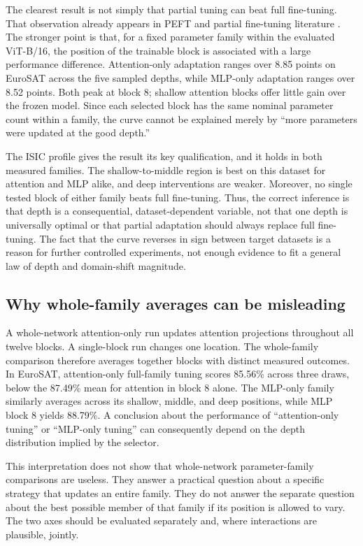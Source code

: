 \documentclass[11pt]{article}
\begin{document}
The clearest result is not simply that partial tuning can beat full fine-tuning. That observation already appears in PEFT and partial fine-tuning literature \cite{basu2024,lian2022,ye2023}. The stronger point is that, for a fixed parameter family within the evaluated ViT-B/16, the position of the trainable block is associated with a large performance difference. Attention-only adaptation ranges over 8.85 points on EuroSAT across the five sampled depths, while MLP-only adaptation ranges over 8.52 points. Both peak at block 8; shallow attention blocks offer little gain over the frozen model. Since each selected block has the same nominal parameter count within a family, the curve cannot be explained merely by “more parameters were updated at the good depth.”

The ISIC profile gives the result its key qualification, and it holds in both measured families. The shallow-to-middle region is best on this dataset for attention and MLP alike, and deep interventions are weaker. Moreover, no single tested block of either family beats full fine-tuning. Thus, the correct inference is that depth is a consequential, dataset-dependent variable, not that one depth is universally optimal or that partial adaptation should always replace full fine-tuning. The fact that the curve reverses in sign between target datasets is a reason for further controlled experiments, not enough evidence to fit a general law of depth and domain-shift magnitude.

\subsection{Why whole-family averages can be misleading}

A whole-network attention-only run updates attention projections throughout all twelve blocks. A single-block run changes one location. The whole-family comparison therefore averages together blocks with distinct measured outcomes. In EuroSAT, attention-only full-family tuning scores 85.56\% across three draws, below the 87.49\% mean for attention in block 8 alone. The MLP-only family similarly averages across its shallow, middle, and deep positions, while MLP block 8 yields 88.79\%. A conclusion about the performance of “attention-only tuning” or “MLP-only tuning” can consequently depend on the depth distribution implied by the selector.

This interpretation does not show that whole-network parameter-family comparisons are useless. They answer a practical question about a specific strategy that updates an entire family. They do not answer the separate question about the best possible member of that family if its position is allowed to vary. The two axes should be evaluated separately and, where interactions are plausible, jointly.
\end{document}
